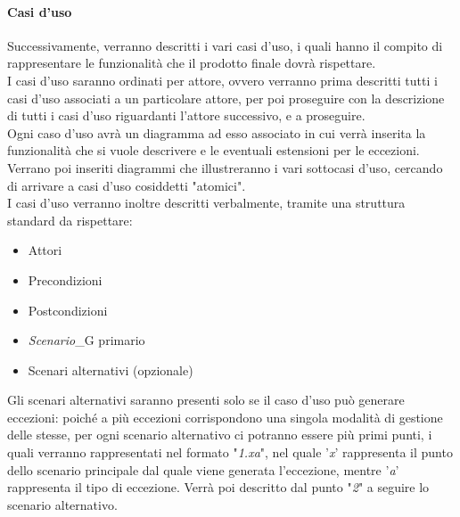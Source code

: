 \paragraph{Casi d'uso}
Successivamente, verranno descritti i vari casi d'uso, i quali hanno il compito di rappresentare le funzionalità che il prodotto finale dovrà rispettare. \\
I casi d'uso saranno ordinati per attore, ovvero verranno prima descritti tutti i casi d'uso associati a un particolare attore, per poi proseguire con la descrizione di tutti i casi d'uso riguardanti l'attore successivo, e a proseguire. \\
Ogni caso d'uso avrà un diagramma ad esso associato in cui verrà inserita la funzionalità che si vuole descrivere e le eventuali estensioni per le eccezioni. Verrano poi inseriti diagrammi che illustreranno i vari sottocasi d'uso, cercando di arrivare a casi d'uso cosiddetti "atomici". \\
I casi d'uso verranno inoltre descritti verbalmente, tramite una struttura standard da rispettare:
\begin{itemize}
    \item Attori
    \item Precondizioni
    \item Postcondizioni
    \item \textit{Scenario}_G primario
    \item Scenari alternativi (opzionale)
\end{itemize}
\begin{comment}
I sottocasi d'uso non verranno descritti individualmente, poiché sarà già tutto descritto a livello atomico nello scenario principale del relativo caso d'uso "padre".
\end{comment}
Gli scenari alternativi saranno presenti solo se il caso d'uso può generare eccezioni: poiché a più eccezioni corrispondono una singola modalità di gestione delle stesse, per ogni scenario alternativo ci potranno essere più primi punti, i quali verranno rappresentati nel formato "\textit{1.xa}", nel quale '\textit{x}' rappresenta il punto dello scenario principale dal quale viene generata l'eccezione, mentre '\textit{a}' rappresenta il tipo di eccezione. Verrà poi descritto dal punto "\textit{2}" a seguire lo scenario alternativo.
